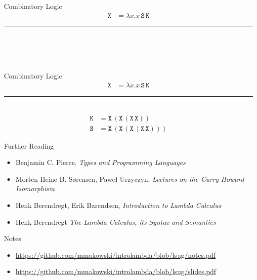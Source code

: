 \documentclass{beamer}
\newcommand{\msym}[1]{\mathtt{#1}}
\newcommand{\hr}[0]{\rule{10.75cm}{0.4pt}\\}
\begin{document}
\begin{frame}{Combinatory Logic}
\begin{align*}
\msym{X} &= \lambda x.x\,\msym{S}\,\msym{K}
\end{align*}
\hr
\begin{align*}
\phantom{\msym{K} = \msym{X}\,(\msym{X}\,(\msym{X}\,\msym{X}))} \\
\phantom{\msym{S} = \msym{X}\,(\msym{X}\,(\msym{X}\,(\msym{X}\,\msym{X})))}
\end{align*}
\end{frame}
\begin{frame}{Combinatory Logic}
\begin{align*}
\msym{X} &= \lambda x.x\,\msym{S}\,\msym{K}
\end{align*}
\hr
\begin{align*}
\msym{K} &= \msym{X}\,(\msym{X}\,(\msym{X}\,\msym{X})) \\
\msym{S} &= \msym{X}\,(\msym{X}\,(\msym{X}\,(\msym{X}\,\msym{X})))
\end{align*}
\end{frame}

\begin{frame}{Further Reading}
\begin{itemize}
\item Benjamin C. Pierce, \emph{Types and Programming Languages}
\item Morten Heine B. Sørensen, Paweł Urzyczyn, \emph{Lectures on the
Curry-Howard Isomorphism}
\item Henk Berendregt, Erik Barendsen, \emph{Introduction to Lambda
Calculus}
\item Henk Berendregt \emph{The Lambda Calculus, its Syntax and
Semantics}
\end{itemize}
\end{frame}

\begin{frame}{Notes}
\begin{itemize}
\item \url{https://github.com/mmakowski/introlambda/blob/lsug/notes.pdf}
\item \url{https://github.com/mmakowski/introlambda/blob/lsug/slides.pdf}
\end{itemize}
\end{frame}
\end{document}
